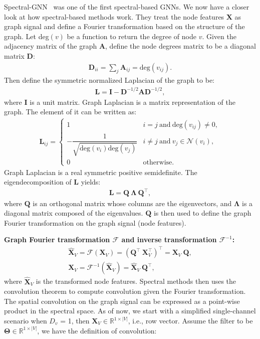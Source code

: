Spectral-GNN~\cite{spectralgnn} was one of the first spectral-based GNNs. 
We now have a closer look at how spectral-based methods work. They treat the node features $\mathbf{X}$ as graph signal and define a Fourier transformation based on the structure of the graph. Let deg$(v)$ be a function to return the degree of node $v$. Given the adjacency matrix of the graph $\mathbf{A}$, define the node degrees matrix to be a diagonal matrix $\mathbf{D}$:
\begin{gather}
\mathbf{D}_{ii} = \sum_j \mathbf{A}_{ij} = \text{deg}(v_{ij}). 
\end{gather}
Then define the symmetric normalized Laplacian of the graph to be:
\begin{gather}
\mathbf{L} = \mathbf{I} - \mathbf{D}^{-1/2}\mathbf{A}\mathbf{D}^{-1/2},
\end{gather}
where $\mathbf{I}$ is a unit matrix. Graph Laplacian is a matrix representation of the graph. The element of it can be written as:
\begin{gather}
\mathbf{L}_{ij} =
  \begin{cases}
   1 & i=j ~\text{and}~ \text{deg}(v_{ij}) \ne 0,\\
   -\dfrac{1}{\sqrt{\text{deg}(v_i) \text{deg}(v_j)}} & i \ne j ~\text{and}~ v_j \in \mathcal{N}(v_i),\\
   0 & \text{otherwise}.
  \end{cases}
\end{gather}
Graph Laplacian is a real symmetric positive semidefinite. The eigendecomposition of $\mathbf{L}$ yields:
\begin{gather}
\mathbf{L} = \mathbf{Q}~\mathbf{\Lambda}~\mathbf{Q}^\intercal,
\end{gather}
where $\mathbf{Q}$ is an orthogonal matrix whose columns are the eigenvectors, and $\mathbf{\Lambda}$ is a diagonal matrix composed of the eigenvalues. $\mathbf{Q}$ is then used to define the graph Fourier transformation on the graph signal (node features).

\vspace{2mm}
\noindent \textbf{Graph Fourier transformation $\mathcal{F}$ and inverse transformation $\mathcal{F}^{-1}$:}
\begin{gather}
\hat {\mathbf{X}}_V = \mathcal{F}(\mathbf{X}_V) = (\mathbf{Q}^\intercal~\mathbf{X}_V^\intercal)^\intercal = \mathbf{X}_V~\mathbf{Q},\\
\mathbf{X}_V = \mathcal{F}^{-1}(\hat {\mathbf{X}}_V) = \hat {\mathbf{X}}_V~\mathbf{Q}^\intercal,
\end{gather}
where $\hat {\mathbf{X}}_V$ is the transformed node features. Spectral methods then uses the convolution theorem to compute convolution given the Fourier transformation. The spatial convolution on the graph signal can be expressed as a point-wise product in the spectral space. As of now, we start with a simplified single-channel scenario when $D_v$ = 1, then $\mathbf{X}_V \in \mathbb{R}^{1 \times |V|}$, i.e., row vector. Assume the filter to be $\mathbf{\Theta} \in \mathbb{R}^{1 \times |V|}$, we have the definition of convolution:

